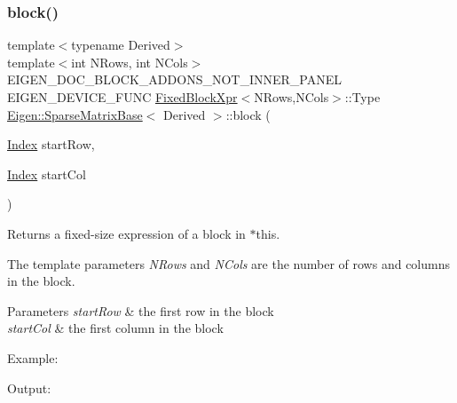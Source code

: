 \subsubsection{\texorpdfstring{block()}{block()}\hspace{0.1cm}{\footnotesize\ttfamily [2/3]}}
{\footnotesize\ttfamily template$<$typename Derived$>$ \\
template$<$int N\+Rows, int N\+Cols$>$ \\
E\+I\+G\+E\+N\+\_\+\+D\+O\+C\+\_\+\+B\+L\+O\+C\+K\+\_\+\+A\+D\+D\+O\+N\+S\+\_\+\+N\+O\+T\+\_\+\+I\+N\+N\+E\+R\+\_\+\+P\+A\+N\+EL E\+I\+G\+E\+N\+\_\+\+D\+E\+V\+I\+C\+E\+\_\+\+F\+U\+NC \mbox{\hyperlink{struct_eigen_1_1_sparse_matrix_base_1_1_fixed_block_xpr}{Fixed\+Block\+Xpr}}$<$N\+Rows,N\+Cols$>$\+::Type \mbox{\hyperlink{class_eigen_1_1_sparse_matrix_base}{Eigen\+::\+Sparse\+Matrix\+Base}}$<$ Derived $>$\+::block (\begin{DoxyParamCaption}\item[{\mbox{\hyperlink{struct_eigen_1_1_eigen_base_a554f30542cc2316add4b1ea0a492ff02}{Index}}}]{start\+Row,  }\item[{\mbox{\hyperlink{struct_eigen_1_1_eigen_base_a554f30542cc2316add4b1ea0a492ff02}{Index}}}]{start\+Col }\end{DoxyParamCaption})\hspace{0.3cm}{\ttfamily [inline]}}

\begin{DoxyReturn}{Returns}
a fixed-\/size expression of a block in $\ast$this.
\end{DoxyReturn}
The template parameters {\itshape N\+Rows} and {\itshape N\+Cols} are the number of rows and columns in the block.


\begin{DoxyParams}{Parameters}
{\em start\+Row} & the first row in the block \\
\hline
{\em start\+Col} & the first column in the block\\
\hline
\end{DoxyParams}
Example\+: 
\begin{DoxyCodeInclude}{0}
\end{DoxyCodeInclude}
 Output\+: 
\begin{DoxyVerbInclude}
\end{DoxyVerbInclude}


